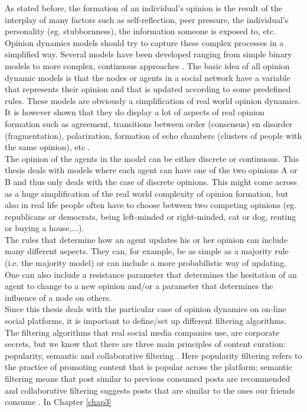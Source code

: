 \documentclass[11 pt , letterpaper , twoside , openright]{book}
\begin{document}
As stated before, the formation of an individual's opinion is the result of the interplay of many factors such as self-reflection, peer pressure, the individual's personality (eg. stubbornness), the information someone is exposed to, etc.  Opinion dynamics models should try to capture these complex processes in a simplified way. Several models have been developed ranging from simple binary models to more complex, continuous approaches \cite{Sirbu2016}. The basic idea of all opinion dynamic models is that the nodes or agents in a social network have a variable that represents their opinion and that is updated according to some predefined rules. These models are obviously a simplification of real world opinion dynamics. It is however shown that they do display a lot of aspects of real opinion formation such as agreement, transitions between order (consensus) en disorder (fragmentation), polarization, formation of echo chambers (clusters of people with the same opinion), etc \cite{Sirbu2016}. \\
The opinion of the agents in the model can be either discrete or continuous. This thesis deals with models where each agent can have one of the two opinions A or B and thus only deals with the case of discrete opinions. This might come across as a huge simplification of the real world complexity of opinion formation, but also in real life people often have to choose between two competing opinions (eg. republicans or democrats, being left-minded or right-minded, cat or dog, renting or buying a house,...). \\
The rules that determine how an agent updates his or her opinion can include many different aspects. They can, for example, be as simple as a majority rule (i.e. the majority model) or can include a more probabilistic way of updating. One can also include a resistance parameter that determines the hesitation of an agent to change to a new opinion and/or a parameter that determines the influence of a node on others. \\
Since this thesis deals with the particular case of opinion dynamics on on-line social platforms, it is important to define/set up different filtering algorithms. The filtering algorithms that real social media companies use, are corporate secrets, but we know that there are three main principles of content curation: popularity, semantic and collaborative filtering \cite{Perra2019}. Here popularity filtering refers to the practice of promoting content that is popular across the platform; semantic filtering means that post similar to previous consumed posts are recommended and collaborative filtering suggests posts that are similar to the ones our friends consume \cite{Perra2019}. In Chapter \ref{chap3} %
\end{document}
